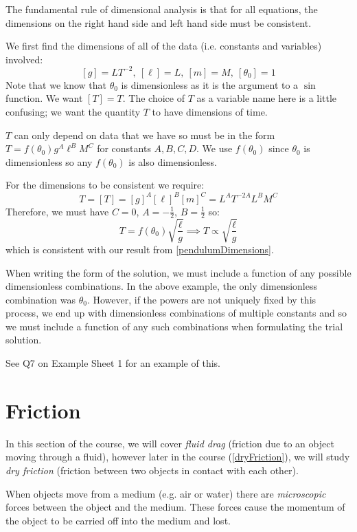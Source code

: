 \documentclass[../main.tex]{subfiles}
\begin{document}
The fundamental rule of dimensional analysis is that for all equations, the dimensions on the right hand side and left hand side must be consistent.
\begin{example}
  We first find the dimensions of all of the data (i.e. constants and variables) involved:
  \[
    [g] = LT^{-2},\ [\ell] = L,\ [m] = M,\ [\theta_0] = 1
  \]
  Note that we know that $\theta_0$ is dimensionless as it is the argument to a $\sin$ function.
  We want $[T] = T$.
  The choice of $T$ as a variable name here is a little confusing; we want the quantity $T$ to have dimensions of time.

  $T$ can only depend on data that we have so must be in the form $T = f(\theta_0)g^{A}\ell^{B}M^{C}$ for constants $A, B, C, D$.
  We use $f(\theta_0)$ since $\theta_0$ is dimensionless so any $f(\theta_0)$ is also dimensionless.

  For the dimensions to be consistent we require:
  \[
    T = [T] = [g]^{A}[\ell]^{B}[m]^{C} = L^{A}T^{-2A}L^{B}M^{C}
  \]
  Therefore, we must have $C = 0$, $A = -\frac{1}{2}$, $B = \frac{1}{2}$ so:
  \[
    T = f(\theta_0) \sqrt{\frac{\ell}{g}} \implies T \propto \sqrt{\frac{\ell}{g}}
  \]
  which is consistent with our result from \cref{pendulumDimensions}.
\end{example}
\begin{remark}[Note]
  When writing the form of the solution, we must include a function of any possible dimensionless combinations.
  In the above example, the only dimensionless combination was $\theta_0$.
  However, if the powers are not uniquely fixed by this process, we end up with dimensionless combinations of multiple constants and so we must include a function of any such combinations when formulating the trial solution.

  See Q7 on Example Sheet 1 for an example of this.
\end{remark}
\section{Friction}
\label{frictionDrag}
\begin{remark}[Note]
  In this section of the course, we will cover \textit{fluid drag} (friction due to an object moving through a fluid), however later in the course (\cref{dryFriction}), we will study \textit{dry friction} (friction between two objects in contact with each other).
\end{remark}
When objects move from a medium (e.g. air or water) there are \textit{microscopic} forces between the object and the medium.
These forces cause the momentum of the object to be carried off into the medium and lost.
\end{document}

